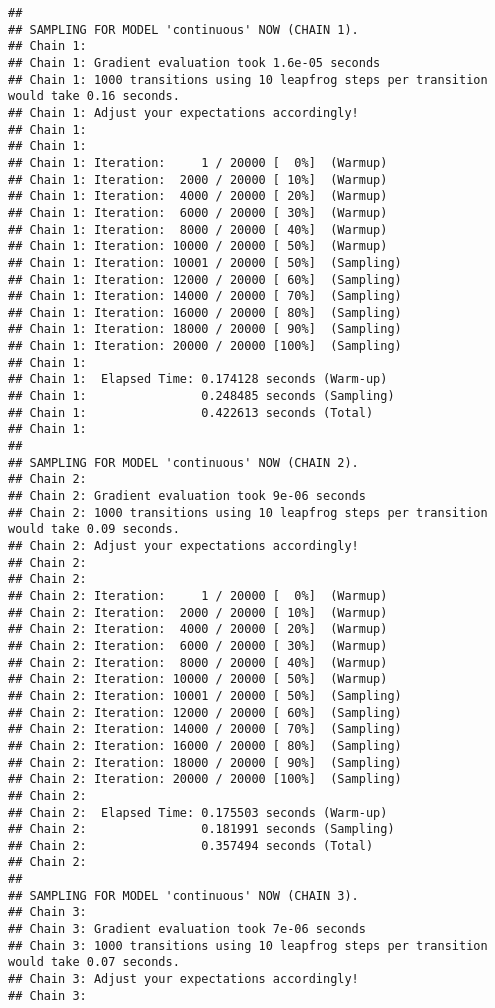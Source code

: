 \documentclass[
]{article}
\begin{document}
\begin{verbatim}
## 
## SAMPLING FOR MODEL 'continuous' NOW (CHAIN 1).
## Chain 1: 
## Chain 1: Gradient evaluation took 1.6e-05 seconds
## Chain 1: 1000 transitions using 10 leapfrog steps per transition would take 0.16 seconds.
## Chain 1: Adjust your expectations accordingly!
## Chain 1: 
## Chain 1: 
## Chain 1: Iteration:     1 / 20000 [  0%]  (Warmup)
## Chain 1: Iteration:  2000 / 20000 [ 10%]  (Warmup)
## Chain 1: Iteration:  4000 / 20000 [ 20%]  (Warmup)
## Chain 1: Iteration:  6000 / 20000 [ 30%]  (Warmup)
## Chain 1: Iteration:  8000 / 20000 [ 40%]  (Warmup)
## Chain 1: Iteration: 10000 / 20000 [ 50%]  (Warmup)
## Chain 1: Iteration: 10001 / 20000 [ 50%]  (Sampling)
## Chain 1: Iteration: 12000 / 20000 [ 60%]  (Sampling)
## Chain 1: Iteration: 14000 / 20000 [ 70%]  (Sampling)
## Chain 1: Iteration: 16000 / 20000 [ 80%]  (Sampling)
## Chain 1: Iteration: 18000 / 20000 [ 90%]  (Sampling)
## Chain 1: Iteration: 20000 / 20000 [100%]  (Sampling)
## Chain 1: 
## Chain 1:  Elapsed Time: 0.174128 seconds (Warm-up)
## Chain 1:                0.248485 seconds (Sampling)
## Chain 1:                0.422613 seconds (Total)
## Chain 1: 
## 
## SAMPLING FOR MODEL 'continuous' NOW (CHAIN 2).
## Chain 2: 
## Chain 2: Gradient evaluation took 9e-06 seconds
## Chain 2: 1000 transitions using 10 leapfrog steps per transition would take 0.09 seconds.
## Chain 2: Adjust your expectations accordingly!
## Chain 2: 
## Chain 2: 
## Chain 2: Iteration:     1 / 20000 [  0%]  (Warmup)
## Chain 2: Iteration:  2000 / 20000 [ 10%]  (Warmup)
## Chain 2: Iteration:  4000 / 20000 [ 20%]  (Warmup)
## Chain 2: Iteration:  6000 / 20000 [ 30%]  (Warmup)
## Chain 2: Iteration:  8000 / 20000 [ 40%]  (Warmup)
## Chain 2: Iteration: 10000 / 20000 [ 50%]  (Warmup)
## Chain 2: Iteration: 10001 / 20000 [ 50%]  (Sampling)
## Chain 2: Iteration: 12000 / 20000 [ 60%]  (Sampling)
## Chain 2: Iteration: 14000 / 20000 [ 70%]  (Sampling)
## Chain 2: Iteration: 16000 / 20000 [ 80%]  (Sampling)
## Chain 2: Iteration: 18000 / 20000 [ 90%]  (Sampling)
## Chain 2: Iteration: 20000 / 20000 [100%]  (Sampling)
## Chain 2: 
## Chain 2:  Elapsed Time: 0.175503 seconds (Warm-up)
## Chain 2:                0.181991 seconds (Sampling)
## Chain 2:                0.357494 seconds (Total)
## Chain 2: 
## 
## SAMPLING FOR MODEL 'continuous' NOW (CHAIN 3).
## Chain 3: 
## Chain 3: Gradient evaluation took 7e-06 seconds
## Chain 3: 1000 transitions using 10 leapfrog steps per transition would take 0.07 seconds.
## Chain 3: Adjust your expectations accordingly!
## Chain 3: 

\end{verbatim}
\end{document}
